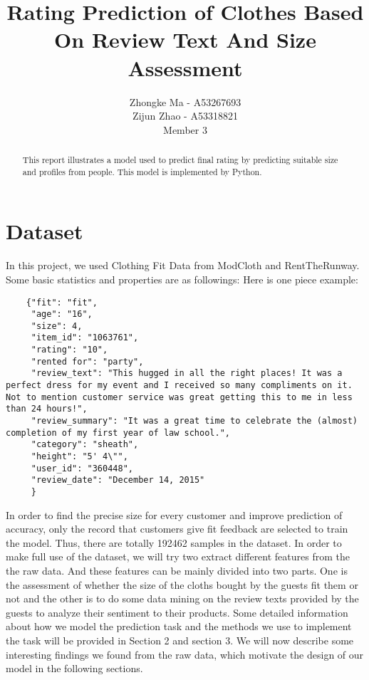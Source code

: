 \documentclass[letterpaper, 10 pt, conference]{ieeeconf}  %
\title{\LARGE \bf
Rating Prediction of Clothes Based On Review Text And Size Assessment
}
\author{Zhongke Ma - A53267693%
	\\Zijun Zhao - A53318821%
	\\Member 3
	
}
\begin{document}
\maketitle
\thispagestyle{empty}
\pagestyle{empty}


\begin{abstract}

This report illustrates a model used to predict final rating by predicting suitable size and profiles from people. This model is implemented by Python.

\end{abstract}


\section{Dataset}
	
	In this project, we used Clothing Fit Data from ModCloth and RentTheRunway. Some basic statistics and properties are as followings:
	Here is one piece example:

	\lstset{language=C}
	\begin{lstlisting}
	{"fit": "fit", 
	 "age": "16", 
	 "size": 4, 
	 "item_id": "1063761", 
	 "rating": "10", 
	 "rented for": "party", 
	 "review_text": "This hugged in all the right places! It was a perfect dress for my event and I received so many compliments on it. Not to mention customer service was great getting this to me in less than 24 hours!", 
	 "review_summary": "It was a great time to celebrate the (almost) completion of my first year of law school.", 
	 "category": "sheath", 
	 "height": "5' 4\"", 
	 "user_id": "360448", 
	 "review_date": "December 14, 2015"
	 }
	\end{lstlisting}
	
	In order to find the precise size for every customer and improve prediction of accuracy, only the record that customers give fit feedback are selected to train the model. Thus, there are totally 192462 samples in the dataset. 
	In order to make full use of the dataset, we will try two extract different features from the the raw data. And these features can be mainly divided into two parts. One is the assessment of whether the size of the cloths bought by the guests fit them or not and the other is to do some data mining on the review texts provided by the guests to analyze their sentiment to their products. Some detailed information about how we model the prediction task and the methods we use to implement the task will be provided in Section 2 and section 3. We will now describe some interesting findings we found from the raw data, which motivate the design of our model in the following sections.
	
\end{document}
